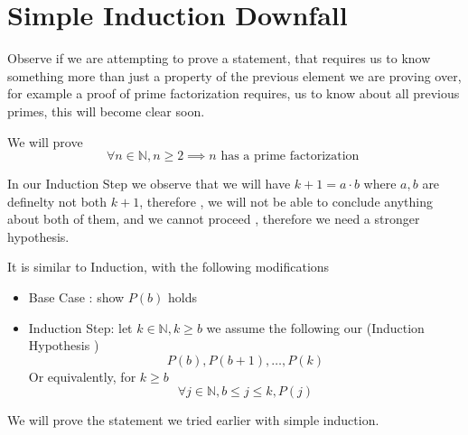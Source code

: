\documentclass[11pt]{book}
\begin{document}
\section{Simple Induction Downfall}%
\label{sec:simple_induction_downfall}

Observe if we are attempting to prove a statement, that requires us to know something more than just a property of the previous element we are proving over, for example a proof of prime factorization requires, us to know about all previous primes, this will become clear soon.

We will prove 
\[
\forall n \in \mathbb{N} , n \ge 2 \implies n \text{ has a prime factorization  } 
\]

In our Induction Step we observe that we will have $k + 1 = a \cdot b$ where $a, b$ are definelty not both $k + 1$,  therefore , we will not be able to conclude anything about both of them, and we cannot proceed , therefore we need a stronger hypothesis.

\begin{defn}\label{defn:complete_induction}
    It is similar to Induction, with the following modifications
    \begin{itemize}
        \item Base Case : show $P\left(b\right) $ holds 
        \item Induction Step: let $k\in \mathbb{N} , k\ge b$ we assume the following our (Induction Hypothesis )
            \[
            P\left(b\right) , P\left(b + 1\right) , \ldots , P\left(k\right) 
            \]
            Or equivalently, for $k\ge b$ 
            \[
            \forall j \in \mathbb{N} , b \le j \le k, P\left(j\right) 
            \]
    \end{itemize}
\end{defn}

We will prove the statement we tried earlier with simple induction.
\end{document}
